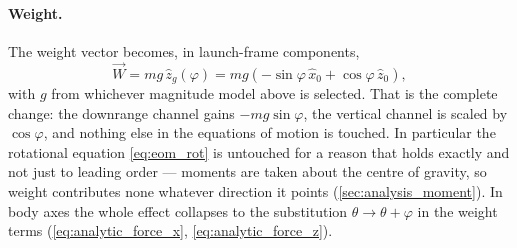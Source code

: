 \paragraph{Weight.} The weight vector becomes, in launch-frame components,
\begin{equation} \label{eq:weight_rotated}
    \vec{W} = mg\,\hat{z}_g(\varphi)
        = mg\left(-\sin\varphi\,\hat{x}_0 + \cos\varphi\,\hat{z}_0\right),
\end{equation}
with $g$ from whichever magnitude model above is selected. That is the complete change: the
downrange channel gains $-mg\sin\varphi$, the vertical channel is scaled by $\cos\varphi$, and
nothing else in the equations of motion is touched. In particular the rotational equation
\autoref{eq:eom_rot} is untouched for a reason that holds exactly and not just to leading order
--- moments are taken about the centre of gravity, so weight contributes none whatever direction
it points (\autoref{sec:analysis_moment}). In body axes the whole effect collapses to the
substitution $\theta \to \theta + \varphi$ in the weight terms
(\autoref{eq:analytic_force_x}, \autoref{eq:analytic_force_z}).

